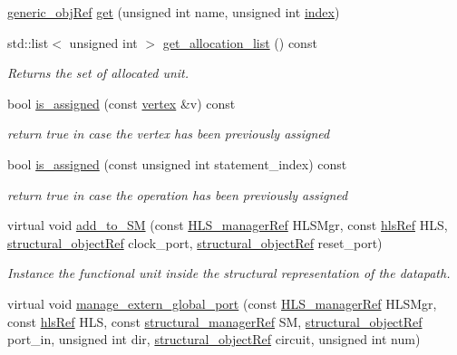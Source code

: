 \begin{DoxyCompactItemize}
\hyperlink{generic__obj_8hpp_acb533b2ef8e0fe72e09a04d20904ca81}{generic\+\_\+obj\+Ref} \hyperlink{classfu__binding_a896dbcb71c9389ef6056d44158962130}{get} (unsigned int name, unsigned int \hyperlink{tutorial__pact__2019_2Introduction_2third_2include_2Keccak_8h_a028c9bdc8344cca38ab522a337074797}{index})
\item 
std\+::list$<$ unsigned int $>$ \hyperlink{classfu__binding_a833c4b4b6c6f4d52eec19e1de37ba514}{get\+\_\+allocation\+\_\+list} () const
\begin{DoxyCompactList}\small\item\em Returns the set of allocated unit. \end{DoxyCompactList}\item 
bool \hyperlink{classfu__binding_a083bb7586153b82403d770d191c660aa}{is\+\_\+assigned} (const \hyperlink{graph_8hpp_abefdcf0544e601805af44eca032cca14}{vertex} \&v) const
\begin{DoxyCompactList}\small\item\em return true in case the vertex has been previously assigned \end{DoxyCompactList}\item 
bool \hyperlink{classfu__binding_a78c721c13b733499ba559e67ed2318b2}{is\+\_\+assigned} (const unsigned int statement\+\_\+index) const
\begin{DoxyCompactList}\small\item\em return true in case the operation has been previously assigned \end{DoxyCompactList}\item 
virtual void \hyperlink{classfu__binding_a1485a3490fff093e44664db54ecdf39a}{add\+\_\+to\+\_\+\+SM} (const \hyperlink{hls__manager_8hpp_acd3842b8589fe52c08fc0b2fcc813bfe}{H\+L\+S\+\_\+manager\+Ref} H\+L\+S\+Mgr, const \hyperlink{hls_8hpp_a75d0c73923d0ddfa28c4843a802c73a7}{hls\+Ref} H\+LS, \hyperlink{structural__objects_8hpp_a8ea5f8cc50ab8f4c31e2751074ff60b2}{structural\+\_\+object\+Ref} clock\+\_\+port, \hyperlink{structural__objects_8hpp_a8ea5f8cc50ab8f4c31e2751074ff60b2}{structural\+\_\+object\+Ref} reset\+\_\+port)
\begin{DoxyCompactList}\small\item\em Instance the functional unit inside the structural representation of the datapath. \end{DoxyCompactList}\item 
virtual void \hyperlink{classfu__binding_a8998894fb4f6429cac9792309187e000}{manage\+\_\+extern\+\_\+global\+\_\+port} (const \hyperlink{hls__manager_8hpp_acd3842b8589fe52c08fc0b2fcc813bfe}{H\+L\+S\+\_\+manager\+Ref} H\+L\+S\+Mgr, const \hyperlink{hls_8hpp_a75d0c73923d0ddfa28c4843a802c73a7}{hls\+Ref} H\+LS, const \hyperlink{structural__manager_8hpp_ab3136f0e785d8535f8d252a7b53db5b5}{structural\+\_\+manager\+Ref} SM, \hyperlink{structural__objects_8hpp_a8ea5f8cc50ab8f4c31e2751074ff60b2}{structural\+\_\+object\+Ref} port\+\_\+in, unsigned int dir, \hyperlink{structural__objects_8hpp_a8ea5f8cc50ab8f4c31e2751074ff60b2}{structural\+\_\+object\+Ref} circuit, unsigned int num)

\end{DoxyCompactItemize}
